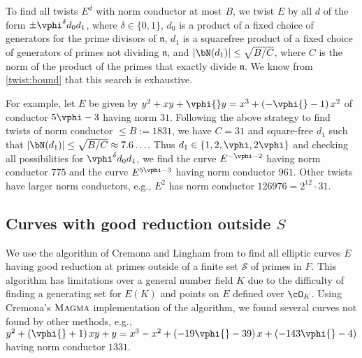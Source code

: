 \documentclass{amsart}
\newcommand{\n}{\mathfrak{n}}
\begin{document}
To find all twists $E^d$ with norm conductor at most $B$, we twist $E$
by all $d$ of the form $\pm \vphi^{\delta} d_0 d_1$, where $\delta\in
\{0,1\}$, $d_0$ is a product of a fixed choice of generators for
the prime divisors of $\n$, 
$d_1$ is a squarefree product of a fixed choice of generators of 
primes not dividing $\n$, and
$|\bN(d_1)| \leq \sqrt{B/C}$, where $C$ is the norm of the product of
the primes that exactly divide $\n$. We know from \ref{twist:bound} that 
this search is exhaustive.


For example, let $E$ be given by $y^2 + xy + \vphi{}y = x^3 +
\left(-\vphi{} - 1\right)x^2 $ of conductor $5\vphi - 3$ having norm $31$.
Following the above strategy to find twists of norm conductor $\leq
B := 1831$, we have $C=31$ and square-free $d_1$ such that
$|\bN(d_1)| \leq \sqrt{B/C} \approx 7.6\ldots$. Thus $d_1 \in \{1, 2,
\vphi, 2\vphi\}$ and checking all possibilities for
$\vphi^{\delta} d_0 d_1$, we find the curve $E^{-\vphi-2}$ having
norm conductor $775$ and the curve $E^{5\vphi-3}$ having norm conductor
$961$. Other twists have larger norm conductors, e.g., $E^2$ has norm
conductor $126976=2^{12}\cdot 31$.


\subsection{Curves with good reduction outside $S$}\label{sec:cremona-lingham}

We use the algorithm of Cremona and Lingham from
\cite{cremona-lingham} to find all elliptic curves $E$ having good
reduction at primes outside of a finite set $\mathcal{S}$ of primes in
$F$. This algorithm has limitations over a general number
field $K$ due to the difficulty of finding a generating set for $E(K)$ and
points on $E$ defined over $\cO_K$.
Using Cremona's $\textsc{Magma}$ implementation of the algorithm, we 
found several curves not found by other methods, e.g.,  
$y^2 + \left(\vphi{} +  1\right)xy + y = x^3 -x^2 + \left(-19 \vphi{} - 
 39\right)x + \left(-143 \vphi{} - 4\right)$ 
having norm conductor $1331$.
\end{document}

